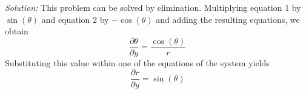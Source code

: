 \documentclass[11pt]{exam}
\begin{document}
\begin{questions}
\begin{parts}
\textit{Solution:} This problem can be solved by elimination. Multiplying equation 1 by $\sin(\theta)$ and equation 2 by $-\cos(\theta)$ and adding the resulting equations, we obtain
\begin{equation*}
\frac{\partial \theta}{\partial y} = \frac{\cos(\theta)}{r}
\end{equation*}
Substituting this value within one of the equations of the system yields
\begin{equation*}
\frac{\partial r}{\partial y} = \sin(\theta)
\end{equation*}
\end{parts}



\end{questions}
\end{document}
